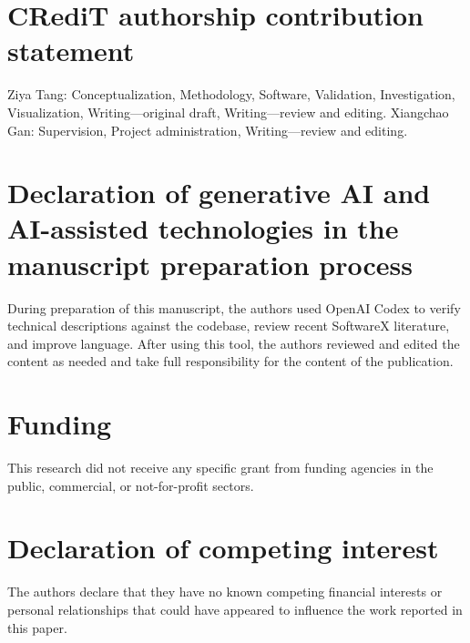 \documentclass[preprint,12pt,a4paper]{elsarticle}
\begin{document}
\section*{CRediT authorship contribution statement}

Ziya Tang: Conceptualization, Methodology, Software, Validation, Investigation, Visualization,
Writing---original draft, Writing---review and editing. Xiangchao Gan: Supervision, Project
administration, Writing---review and editing.

\section*{Declaration of generative AI and AI-assisted technologies in the manuscript preparation process}

During preparation of this manuscript, the authors used OpenAI Codex to verify technical descriptions
against the codebase, review recent SoftwareX literature, and improve language. After using this
tool, the authors reviewed and edited the content as needed and take full responsibility for the
content of the publication.

\section*{Funding}

This research did not receive any specific grant from funding agencies in the public, commercial,
or not-for-profit sectors.

\section*{Declaration of competing interest}

The authors declare that they have no known competing financial interests or personal relationships
that could have appeared to influence the work reported in this paper.

\begingroup
{}


\endgroup
\end{document}
